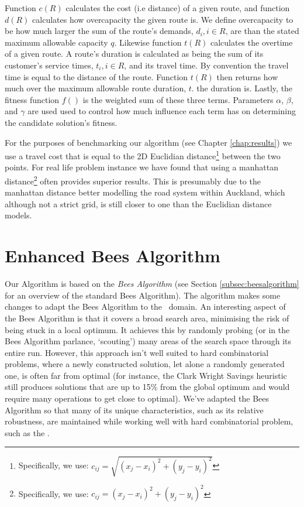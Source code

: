 Function $c(R)$ calculates the cost (i.e distance) of a given route, and function $d(R)$ calculates how overcapacity the given route is. We define overcapacity to be how much larger the sum of the route's demands, $d_i, i \in R$, are than the stated maximum allowable capacity $q$. Likewise function $t(R)$ calculates the overtime of a given route. A route's duration is calculated as being the sum of its customer's service times, $t_i, i \in R$, and its travel time. By convention the travel time is equal to the distance of the route. Function $t(R)$ then returns how much over the maximum allowable route duration, $t$. the duration is. Lastly, the fitness function $f()$ is the weighted sum of these three terms. Parameters $\alpha$, $\beta$, and $\gamma$ are used used to control how much influence each term has on determining the candidate solution's fitness.

For the purposes of benchmarking our algorithm (see Chapter \ref{chap:results}) we use a travel cost that is equal to the 2D Euclidian distance\footnote{Specifically, we use: $c_{ij} = \sqrt{(x_j-x_i)^2 + (y_j-y_i)^2}$} between the two points. For real life problem instance we have found that using a manhattan distance\footnote{Specifically, we use: $c_{ij} = (x_j-x_i)^2 + (y_j-y_i)^2$} often provides superior results. This is presumably due to the manhattan distance better modelling the road system within Auckland, which although not a strict grid, is still closer to one than the Euclidian distance models.

\section{Enhanced Bees Algorithm}
\label{sec:enhancedbeesalgorithm}

Our Algorithm is based on the \emph{Bees Algorithm} (see Section \ref{subsec:beesalgorithm} for an overview of the standard Bees Algorithm). The algorithm makes some changes to adapt the Bees Algorithm to the \VRP\ domain. An interesting aspect of the Bees Algorithm is that it covers a broad search area, minimising the risk of being stuck in a local optimum. It achieves this by randomly probing (or in the Bees Algorithm parlance, `scouting') many areas of the search space through its entire run. However, this approach isn't well suited to hard combinatorial problems, where a newly constructed solution, let alone a randomly generated one, is often far from optimal (for instance, the Clark Wright Savings heuristic still produces solutions that are up to 15\% from the global optimum and would require many operations to get close to optimal). We've adapted the Bees Algorithm so that many of its unique characteristics, such as its relative robustness, are maintained while working well with hard combinatorial problem, such as the \VRP.

